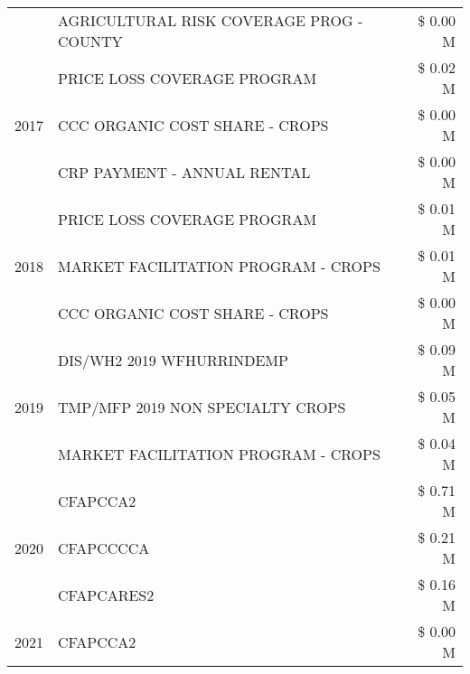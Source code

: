 \begin{tabular}{llr}
 & AGRICULTURAL RISK COVERAGE PROG - COUNTY & \$ 0.00 M \\
\cline{1-3}
\multirow[t]{3}{*}{2017} & PRICE LOSS COVERAGE PROGRAM & \$ 0.02 M \\
 & CCC ORGANIC COST SHARE - CROPS & \$ 0.00 M \\
 & CRP PAYMENT - ANNUAL RENTAL & \$ 0.00 M \\
\cline{1-3}
\multirow[t]{3}{*}{2018} & PRICE LOSS COVERAGE PROGRAM & \$ 0.01 M \\
 & MARKET FACILITATION PROGRAM - CROPS & \$ 0.01 M \\
 & CCC ORGANIC COST SHARE - CROPS & \$ 0.00 M \\
\cline{1-3}
\multirow[t]{3}{*}{2019} & DIS/WH2 2019 WFHURRINDEMP & \$ 0.09 M \\
 & TMP/MFP 2019 NON SPECIALTY CROPS & \$ 0.05 M \\
 & MARKET FACILITATION PROGRAM - CROPS & \$ 0.04 M \\
\cline{1-3}
\multirow[t]{3}{*}{2020} & CFAPCCA2 & \$ 0.71 M \\
 & CFAPCCCCA & \$ 0.21 M \\
 & CFAPCARES2 & \$ 0.16 M \\
\cline{1-3}
2021 & CFAPCCA2 & \$ 0.00 M \\
\cline{1-3}
\bottomrule
\end{tabular}
